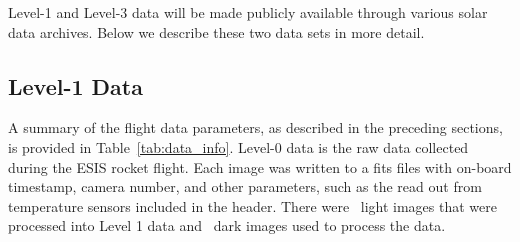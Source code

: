     Level-1 and Level-3 data will be made publicly available through various solar data archives. Below we describe these two data sets in more detail. 
    
    
       
    
	     

    
    \subsection{Level-1 Data}
	    
  
    
    	A summary of the flight data parameters, as described in the preceding sections, is provided in Table~\ref{tab:data_info}. Level-0 data is the raw data collected during the ESIS rocket flight.  
	    Each image was written to a fits files with on-board timestamp, camera number, and other parameters, such as the read out from temperature sensors included in the header.   There were \numDataFrames\ light images that were processed into Level 1 data and \numDarkFrames\ dark images used to process the data.
	    
